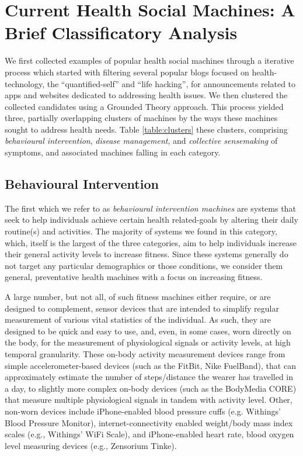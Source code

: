 \documentclass{sig-alternate}
\begin{document}
\section{Current Health Social Machines: A Brief Classificatory Analysis}

We first collected examples of popular health social machines through
a iterative process which started with filtering several popular blogs
focused on health-technology, the ``quantified-self'' and ``life
hacking'', for announcements related to apps and websites dedicated to
addressing health issues. We then clustered the collected candidates
using a Grounded Theory approach.  This process yielded three,
partially overlapping clusters of machines by the ways these machines
sought to address health needs.  Table \ref{table:clusters} these
clusters, comprising \emph{behavioural intervention}, \emph{disease
  management}, and \emph{collective sensemaking} of symptoms, and
associated machines falling in each category.

\subsection{Behavioural Intervention}

The first which we refer to as \emph{behavioural intervention
  machines} are systems that seek to help individuals achieve certain
health related-goals by altering their daily routine(s) and
activities.  The majority of systems we found in this category, which,
itself is the largest of the three categories, aim to help individuals
increase their general activity levels to increase fitness.  Since
these systems generally do not target any particular demographics or
those conditions, we consider them general, preventative health
machines with a focus on increasing fitness.

A large number, but not all, of such fitness machines either require,
or are designed to complement, sensor devices that are intended to
simplify regular measurement of various vital statistics of the
individual.  As such, they are designed to be quick and easy to use,
and, even, in some cases, worn directly on the body, for the measurement
of physiological signals or activity levels, at high temporal
granularity. These on-body activity measurement devices range from
simple accelerometer-based devices (such as the FitBit, Nike
FuelBand), that can approximately estimate the number of
steps/distance the wearer has travelled in a day, to slightly more
complex on-body devices (such as the BodyMedia CORE) that measure
multiple physiological signals in tandem with activity level.  Other,
non-worn devices include iPhone-enabled blood pressure cuffs (e.g.
Withings' Blood Pressure Monitor), internet-connectivity enabled
weight/body mass index scales (e.g., Withings' WiFi Scale), and
iPhone-enabled heart rate, blood oxygen level measuring devices (e.g.,
Zensorium Tinke).  
\end{document}
